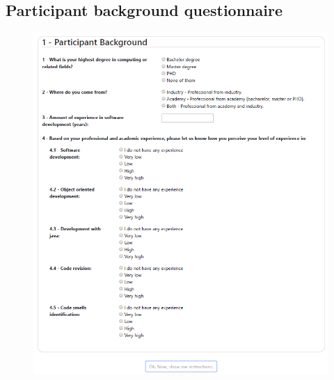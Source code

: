 \begin{apendicesenv}
    
    
    \chapter{Participant background questionnaire}\label{appe:B}
    \begin{figure}[h]
        \centering
        \includegraphics[width=\textwidth]{figures/participantBackground.PNG}
    \end{figure}


\end{apendicesenv}
